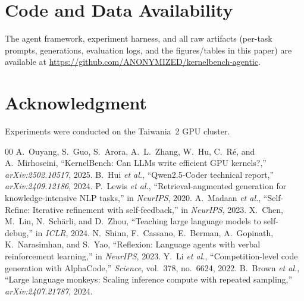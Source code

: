 \documentclass[conference]{IEEEtran}
\begin{document}
\section*{Code and Data Availability}
The agent framework, experiment harness, and all raw artifacts (per-task prompts,
generations, evaluation logs, and the figures/tables in this paper) are available
at \url{https://github.com/ANONYMIZED/kernelbench-agentic}.%

\section*{Acknowledgment}
Experiments were conducted on the Taiwania~2 GPU cluster.

\begin{thebibliography}{00}
 A.~Ouyang, S.~Guo, S.~Arora, A.~L.~Zhang, W.~Hu, C.~R\'e, and
A.~Mirhoseini, ``KernelBench: Can LLMs write efficient GPU kernels?,''
\emph{arXiv:2502.10517}, 2025.
 B.~Hui \emph{et al.}, ``Qwen2.5-Coder technical report,''
\emph{arXiv:2409.12186}, 2024.
 P.~Lewis \emph{et al.}, ``Retrieval-augmented generation for
knowledge-intensive NLP tasks,'' in \emph{NeurIPS}, 2020.
 A.~Madaan \emph{et al.}, ``Self-Refine: Iterative refinement
with self-feedback,'' in \emph{NeurIPS}, 2023.
 X.~Chen, M.~Lin, N.~Sch\"arli, and D.~Zhou, ``Teaching large
language models to self-debug,'' in \emph{ICLR}, 2024.
 N.~Shinn, F.~Cassano, E.~Berman, A.~Gopinath, K.~Narasimhan,
and S.~Yao, ``Reflexion: Language agents with verbal reinforcement learning,'' in
\emph{NeurIPS}, 2023.
 Y.~Li \emph{et al.}, ``Competition-level code generation with
AlphaCode,'' \emph{Science}, vol.~378, no.~6624, 2022.
 B.~Brown \emph{et al.}, ``Large language monkeys: Scaling
inference compute with repeated sampling,'' \emph{arXiv:2407.21787}, 2024.
\end{thebibliography}

\appendices
\end{document}

